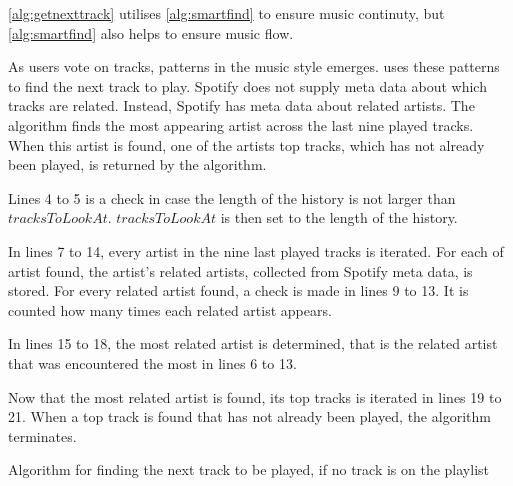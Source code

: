 \cref{alg:getnexttrack} utilises \cref{alg:smartfind} to ensure music continuty, but \cref{alg:smartfind} also helps to ensure music flow.

As users vote on tracks, patterns in the music style
emerges.  uses these patterns to find the next track
to play. Spotify does not supply meta data about which tracks are
related. Instead, Spotify has meta data about related artists. The algorithm finds the most appearing artist across the last nine played tracks. When this artist is found, one of the artists top tracks, which has not already been played, is returned by the algorithm.

Lines 4 to 5 is a check in case the length of the history is not larger than $tracksToLookAt$. $tracksToLookAt$ is then set to the length of the history.

In lines 7 to 14, every artist in the nine last played tracks is iterated. For each of artist found, the artist's related artists, collected from Spotify meta data, is stored. For every related artist found, a check is made in lines 9 to 13. It is counted how many times each related artist appears.

In lines 15 to 18, the most related artist is determined, that is the related artist that was encountered the most in lines 6 to 13.

Now that the most related artist is found, its top tracks is iterated in lines 19 to 21. When a top track is found that has not already been played, the algorithm terminates.

\begin{algorithm}[hbtp]
\caption{Algorithm for finding the next track to be played, if no track is on the playlist}\label{alg:smartfind}
\begin{algorithmic}[1]
		\EndIf{}
					\Else{}
					\EndIf{}
				\EndFor{}
			\EndFor{}
		\EndFor{}
			\EndIf{}
		\EndFor{}
			\State{}
			\EndIf{}
		\EndFor{}
	\EndFunction{}
\end{algorithmic}
\end{algorithm}
